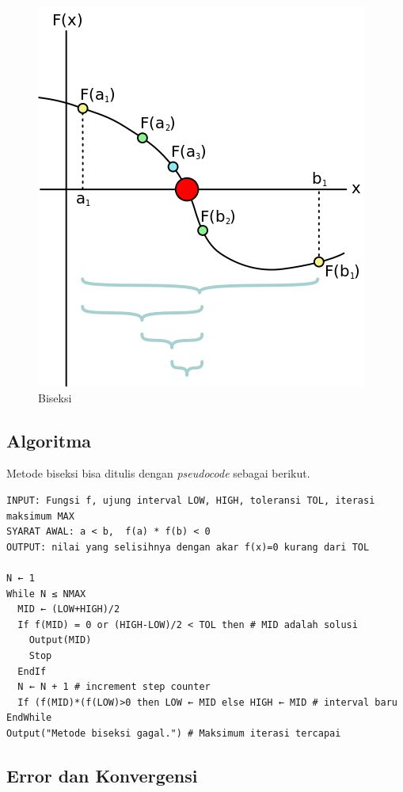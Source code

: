 \begin{figure}
\centering
\includegraphics[scale=0.5]{412px-Bisection_method.svg.png}
\caption{Biseksi}
\end{figure}

    \hypertarget{algoritma}{%
\subsection{Algoritma}\label{algoritma}}

    Metode biseksi bisa ditulis dengan \emph{pseudocode} sebagai berikut.

    \begin{verbatim}
INPUT: Fungsi f, ujung interval LOW, HIGH, toleransi TOL, iterasi maksimum MAX
SYARAT AWAL: a < b,  f(a) * f(b) < 0 
OUTPUT: nilai yang selisihnya dengan akar f(x)=0 kurang dari TOL
 
N ← 1
While N ≤ NMAX 
  MID ← (LOW+HIGH)/2 
  If f(MID) = 0 or (HIGH-LOW)/2 < TOL then # MID adalah solusi
    Output(MID)
    Stop
  EndIf
  N ← N + 1 # increment step counter
  If (f(MID)*(f(LOW)>0 then LOW ← MID else HIGH ← MID # interval baru
EndWhile
Output("Metode biseksi gagal.") # Maksimum iterasi tercapai
\end{verbatim}

    \hypertarget{error-dan-konvergensi}{%
\subsection{Error dan Konvergensi}\label{error-dan-konvergensi}}


